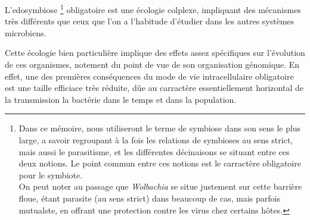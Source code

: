 


L’edosymbiose%
\footnote{Dans ce mémoire, nous utiliseront le terme de symbiose dans son sens le plus large, a savoir regroupant à la fois les relations de symbioses au sens strict, mais aussi le parasitisme, et les différentes décinaisons se situant entre ces deux notions. Le point commun entre ces notions est le carractère obligatoire pour le symbiote.\\
On peut noter au passage que \textit{Wolbachia} se situe justement sur cette barrière floue, étant parasite (au sens strict) dans beaucoup de cas, mais parfois mutualste, en offrant une protection contre les virus chez certains hôtes.}
obligatoire est une écologie colplexe, impliquant des mécanismes très différents que ceux que l’on a l’habitude d’étudier dans les autres systèmes microbiens.

Cette écologie bien particulière implique des effets assez spécifiques sur l'évolution de ces organismes, notement du point de vue de son organisation génomique.
En effet, une des premières conséquences du mode de vie intracellulaire obligatoire est une taille efficiace très réduite, dûe au carractère essentiellement horizontal de la transmission la bactérie dans le temps et dans la population.

